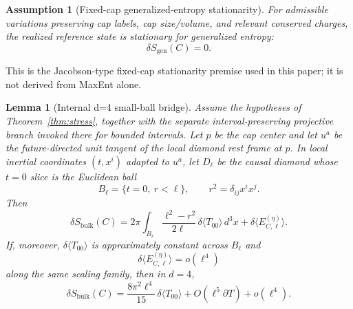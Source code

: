 \documentclass[11pt]{article}
\newtheorem{lemma}[theorem]{Lemma}
\newtheorem{assumption}[theorem]{Assumption}
\begin{document}
\begin{assumption}[Fixed-cap generalized-entropy stationarity]\label{ass:equilibrium}
For admissible variations preserving cap labels, cap size/volume, and relevant conserved charges, the realized reference state is stationary for generalized entropy:
\[
\delta S_{\mathrm{gen}}(C)=0.
\]
\end{assumption}

This is the Jacobson-type fixed-cap stationarity premise used in this paper; it is not
derived from MaxEnt alone.

\begin{lemma}[Internal d=4 small-ball bridge]\label{lem:smallball}
Assume the hypotheses of Theorem~\ref{thm:stress}, together with the separate interval-preserving projective branch invoked there for bounded intervals. Let $p$ be the cap center and let $u^a$ be the future-directed unit tangent of the local diamond rest frame at $p$. In local inertial coordinates $(t,x^i)$ adapted to $u^a$, let $D_\ell$ be the causal diamond whose $t=0$ slice is the Euclidean ball
\[
B_\ell=\{t=0,\ r<\ell\},
\qquad
r^2=\delta_{ij}x^ix^j.
\]
Then
\[
\delta S_{\mathrm{bulk}}(C)
=
2\pi\int_{B_\ell}\frac{\ell^2-r^2}{2\ell}\,\delta\langle T_{00}\rangle\,d^3x
+
\delta\langle E^{(\eta)}_{C,\ell}\rangle.
\]
If, moreover, $\delta\langle T_{00}\rangle$ is approximately constant across $B_\ell$ and
\[
\delta\langle E^{(\eta)}_{C,\ell}\rangle=o(\ell^4)
\]
along the same scaling family, then in $d=4$,
\[
\delta S_{\mathrm{bulk}}(C)
=
\frac{8\pi^2\ell^4}{15}\,\delta\langle T_{00}\rangle
+O(\ell^5\partial T)+o(\ell^4).
\]
\end{lemma}
\end{document}

